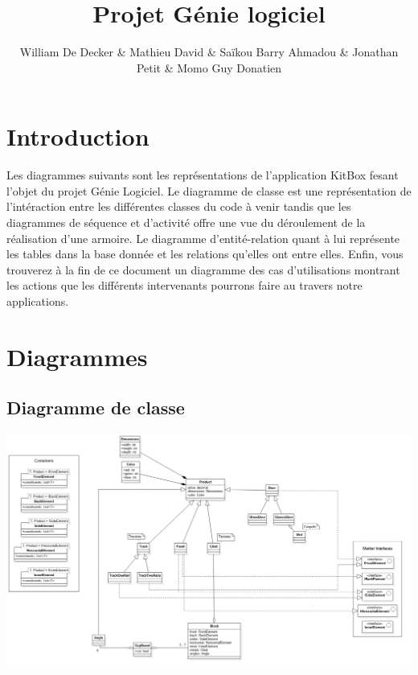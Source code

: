 \documentclass{ecam}
\begin{document}
\title{Projet Génie logiciel \\\vspace{10pt}\fontsize{30pt}{60pt}\selectfont{KitBox}}
\author{William De Decker \& Mathieu David \& Saïkou Barry Ahmadou \linebreak \& Jonathan Petit \& Momo Guy Donatien}
\maketitle

\chapter{Introduction}
Les diagrammes suivants sont les représentations de l'application KitBox fesant l'objet du projet Génie Logiciel. Le diagramme de classe est une représentation de l'intéraction entre les différentes classes du code à venir tandis que les diagrammes de séquence et d'activité offre une vue du déroulement de la réalisation d'une armoire. 
Le diagramme d'entité-relation quant à lui représente les tables dans la base donnée et les relations qu'elles ont entre elles.
Enfin, vous trouverez à la fin de ce document un diagramme des cas d'utilisations montrant les actions que les différents intervenants pourrons faire au travers notre applications.


\pagebreak
\chapter{Diagrammes}

\section{Diagramme de classe}

\begin{center}

\includegraphics[angle=270,scale=0.3]{images/class-diagram.png}
\end{center}
\end{document}
